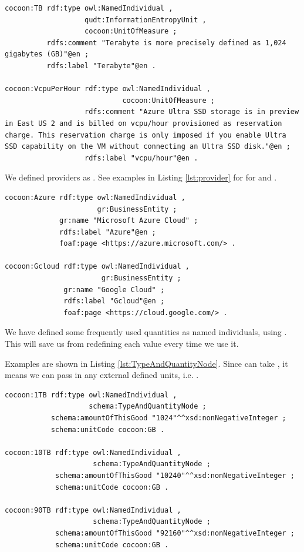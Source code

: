 \begin{lstlisting}[caption={Units},label={lst:units}]
cocoon:TB rdf:type owl:NamedIndividual ,
                   qudt:InformationEntropyUnit ,
                   cocoon:UnitOfMeasure ;
          rdfs:comment "Terabyte is more precisely defined as 1,024 gigabytes (GB)"@en ;
          rdfs:label "Terabyte"@en .

cocoon:VcpuPerHour rdf:type owl:NamedIndividual ,
                            cocoon:UnitOfMeasure ;
                   rdfs:comment "Azure Ultra SSD storage is in preview in East US 2 and is billed on vcpu/hour provisioned as reservation charge. This reservation charge is only imposed if you enable Ultra SSD capability on the VM without connecting an Ultra SSD disk."@en ;
                   rdfs:label "vcpu/hour"@en .
\end{lstlisting}

\label{sec:Provider}
We defined providers as .
See examples in Listing \ref{lst:provider} for for  and .

\begin{lstlisting}[caption={Provider},label={lst:provider}]
cocoon:Azure rdf:type owl:NamedIndividual ,
                      gr:BusinessEntity ;
             gr:name "Microsoft Azure Cloud" ;
             rdfs:label "Azure"@en ;
             foaf:page <https://azure.microsoft.com/> .

cocoon:Gcloud rdf:type owl:NamedIndividual ,
                       gr:BusinessEntity ;
              gr:name "Google Cloud" ;
              rdfs:label "Gcloud"@en ;
              foaf:page <https://cloud.google.com/> .
\end{lstlisting}

\label{sec:TypeAndQuantityNode}
We have defined some frequently used quantities as named individuals,
using .
This will save us from redefining each value every time we use it.

Examples are shown in Listing \ref{lst:TypeAndQuantityNode}.
Since  can take , it means we can pass in any external defined units, i.e.  .

\begin{lstlisting}[caption={Quantities with Type},label={lst:TypeAndQuantityNode}]
cocoon:1TB rdf:type owl:NamedIndividual ,
                    schema:TypeAndQuantityNode ;
           schema:amountOfThisGood "1024"^^xsd:nonNegativeInteger ;
           schema:unitCode cocoon:GB .

cocoon:10TB rdf:type owl:NamedIndividual ,
                     schema:TypeAndQuantityNode ;
            schema:amountOfThisGood "10240"^^xsd:nonNegativeInteger ;
            schema:unitCode cocoon:GB .

cocoon:90TB rdf:type owl:NamedIndividual ,
                     schema:TypeAndQuantityNode ;
            schema:amountOfThisGood "92160"^^xsd:nonNegativeInteger ;
            schema:unitCode cocoon:GB .
\end{lstlisting}
